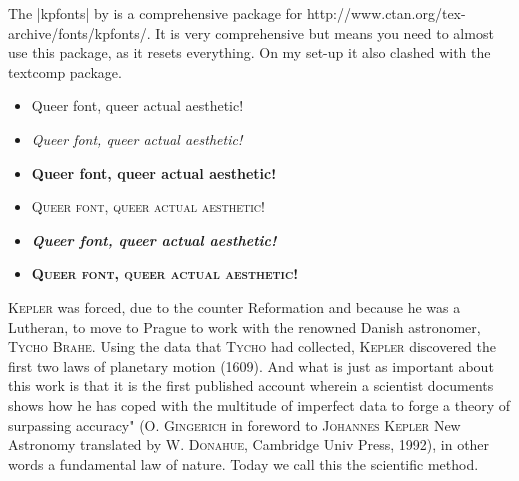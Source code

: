 \bigskip


\normalfont\normalsize

The |kpfonts|  by is a comprehensive package for \latex http://www.ctan.org/tex-archive/fonts/kpfonts/. It is very comprehensive but means you need to almost use this package, as it resets everything. On my set-up it also clashed with the textcomp package.

\begin{itemize}
\item {\selectfont Queer font, queer actual aesthetic!}
\item {\selectfont \textit{Queer font, queer actual aesthetic!}}
\item {\selectfont \textbf{Queer font, queer actual aesthetic!}}
\item {\selectfont \textsc{Queer font, queer actual aesthetic!}}
\item {\selectfont \textbf{\textit{Queer font, queer actual aesthetic!}}}
\item {\selectfont \textsc{\textbf{Queer font, queer actual aesthetic!}}}
\end{itemize}

   


\begin{multicols}{2}
{\textsc{Kepler} was forced, due to the counter Reformation and because he was a Lutheran, to move to Prague to work with the renowned Danish astronomer, \textsc{Tycho Brahe}. Using the data that \textsc{Tycho} had collected, \textsc{Kepler} discovered the first two laws of planetary motion (1609). And what is just as important about this work is that it is the first published account wherein a scientist documents shows how he has coped with the multitude of imperfect data to forge a theory of surpassing accuracy" (\textsc{O. Gingerich} in foreword to \textsc{Johannes Kepler} New Astronomy translated by \textsc{W. Donahue}, Cambridge Univ Press, 1992), in other words a fundamental law of nature. Today we call this the scientific method.}
\end{multicols}

%


